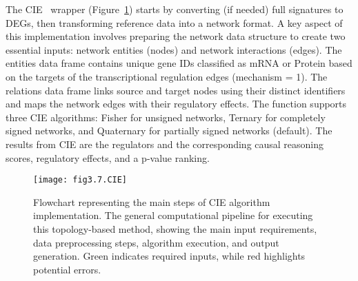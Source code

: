 The \gls{CIE}~\cite{RN81} wrapper (Figure~\ref{fig:fig3.7.CIE}) starts by converting (if needed) full signatures to \gls{DEGs}, then transforming reference data into a network format.
A key aspect of this implementation involves preparing the network data structure to create two essential inputs: network entities (nodes) and network interactions (edges).
The entities data frame contains unique gene IDs classified as \gls{mRNA} or Protein based on the targets of the transcriptional regulation edges (mechanism = 1).
The relations data frame links source and target nodes using their distinct identifiers and maps the network edges with their regulatory effects.
The function supports three \gls{CIE} algorithms: Fisher for unsigned networks, Ternary for completely signed networks, and Quaternary for partially signed networks (default).
The results from \gls{CIE} are the regulators and the corresponding causal reasoning scores, regulatory effects, and a p-value ranking.

\begin{figure}[htbp]
    \centering
    \texttt{[image: fig3.7.CIE]}
    \caption[Flowchart representing the main steps of CIE algorithm implementation.]{Flowchart representing the main steps of \gls{CIE} algorithm implementation. The general computational pipeline for executing this topology-based method, showing the main input requirements, data preprocessing steps, algorithm execution, and output generation. Green indicates required inputs, while red highlights potential errors.}
    \label{fig:fig3.7.CIE}
\end{figure}

